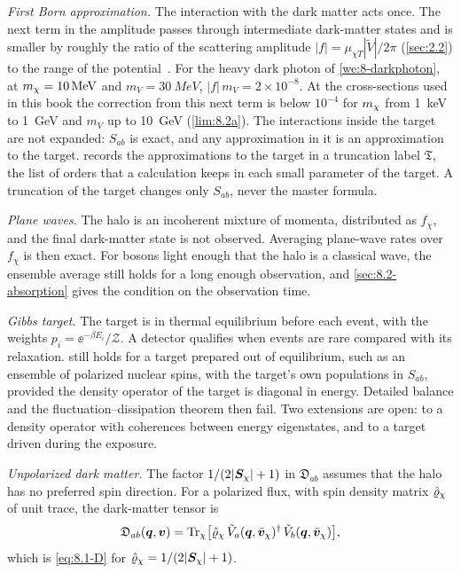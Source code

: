 \emph{First Born approximation.} The interaction with the dark matter acts once. The next term in the amplitude passes through intermediate dark-matter states and is smaller by roughly the ratio of the scattering amplitude $|f| = \mu_{\chi T}|\tilde V|/2\pi$ (\cref{sec:2.2}) to the range of the potential~\cite[Chap.~6]{sakurai2017modern}. For the heavy dark photon of \cref{we:8-darkphoton}, at $m_{\chi} = \SI{10}{MeV}$ and $m_V = \SI{30}{MeV}$, $|f|\,m_V = 2\times10^{-8}$. At the cross-sections used in this book the correction from this next term is below $10^{-4}$ for $m_{\chi}$ from \SI{1}{keV} to \SI{1}{GeV} and $m_V$ up to \SI{10}{GeV} (\cref{lim:8.2a}). The interactions inside the target are not expanded: $S_{ab}$ is exact, and any approximation in it is an approximation to the target.  records the approximations to the target in a truncation label $\mathfrak{T}$, the list of orders that a calculation keeps in each small parameter of the target. A truncation of the target changes only $S_{ab}$, never the master formula.

\emph{Plane waves.} The halo is an incoherent mixture of momenta, distributed as $f_\chi$, and the final dark-matter state is not observed. Averaging plane-wave rates over $f_\chi$ is then exact. For bosons light enough that the halo is a classical wave, the ensemble average still holds for a long enough observation, and \cref{sec:8.2-absorption} gives the condition on the observation time.

\emph{Gibbs target.} The target is in thermal equilibrium before each event, with the weights $p_i = \ee^{-\beta E_i}/\mathcal{Z}$. A detector qualifies when events are rare compared with its relaxation.  still holds for a target prepared out of equilibrium, such as an ensemble of polarized nuclear spins, with the target's own populations in $S_{ab}$, provided the density operator of the target is diagonal in energy. Detailed balance and the fluctuation--dissipation theorem then fail. Two extensions are open: to a density operator with coherences between energy eigenstates, and to a target driven during the exposure.

\emph{Unpolarized dark matter.} The factor $1/(2|\bm{S}_\chi| + 1)$ in $\mathfrak{D}_{ab}$ assumes that the halo has no preferred spin direction. For a polarized flux, with spin density matrix $\hat{\varrho}_\chi$ of unit trace, the dark-matter tensor is
\begin{equation}
  \mathfrak{D}_{ab}(\bm{q}, \bm{v}) = \operatorname{Tr}_\chi\bigl[\hat{\varrho}_\chi\,\tilde V_a(\bm{q}, \bar{\bm{v}}_\chi)^\dagger\,\tilde V_b(\bm{q}, \bar{\bm{v}}_\chi)\bigr] ,
  \label{eq:8.2-polarized}
\end{equation}
which is \cref{eq:8.1-D} for $\hat{\varrho}_\chi = 1/(2|\bm{S}_\chi| + 1)$.

